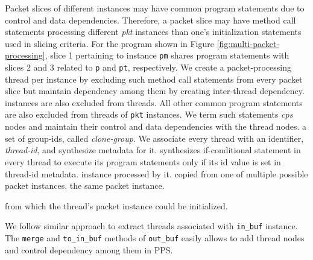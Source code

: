 \documentclass[letterpaper,twocolumn,10pt]{article}
\begin{document}
Packet slices of different instances may have common program 
statements due to control and data dependencies.
Therefore, a packet slice may have method call statements processing 
different \emph{pkt} instances than one's initialization statements 
used in slicing criteria.
For the program shown in Figure \ref{fig:multi-packet-processing}, 
slice 1 pertaining to instance \texttt{pm} shares program statements 
with slices 2 and 3 related to \texttt{p} and \texttt{pt}, 
respectively.
We create a packet-processing thread per instance by excluding such 
method call statements from every packet slice but maintain dependency 
among them by creating inter-thread dependency.
instances are also excluded from threads.
All other common program statements are also excluded from threads of 
\texttt{pkt} instances.
We term such statements \emph{cps} nodes and maintain their control 
and data dependencies with the thread nodes.
a set of group-ids, called \emph{clone-group}.
We associate every thread with an identifier, \emph{thread-id}, and 
synthesize metadata for it.
\ucomp synthesizes if-conditional statement in every thread to execute 
its program statements only if its id value is set in thread-id 
metadata.
instance processed by it.
copied from one of multiple possible packet instances.
the same packet instance.


from which the thread's packet instance could be initialized.

We follow similar approach to extract threads associated with 
\texttt{in\_buf} instance.
The \texttt{merge} and \texttt{to\_in\_buf} methods of 
\texttt{out\_buf} easily allows to add thread nodes and control 
dependency among them in PPS.
\end{document}
